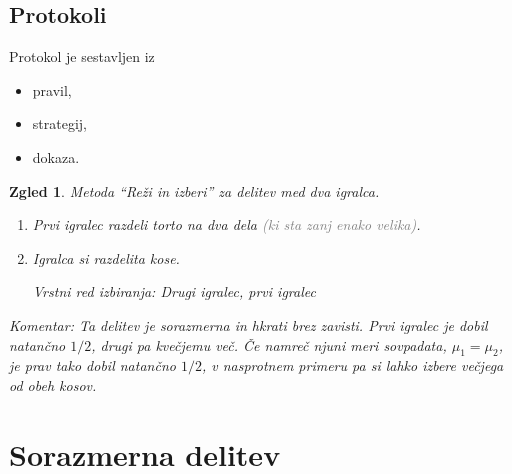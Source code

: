\documentclass{beamer}
\newtheorem{zgled}{Zgled}
\begin{document}
\subsection{Protokoli}
\begin{frame}

Protokol je sestavljen iz

\begin{itemize}
\item pravil,
\item strategij,
\item dokaza.
\end{itemize}

\begin{zgled}
Metoda ``Reži in izberi'' za delitev med dva igralca.
\begin{enumerate}

\item Prvi igralec razdeli torto na dva dela \textcolor{gray}{(ki sta zanj enako velika)}.

\item Igralca si razdelita kose. 

{\em Vrstni red izbiranja: Drugi igralec, prvi igralec}

\end{enumerate}

{\em Komentar:} Ta delitev je {\em sorazmerna\/} in hkrati {\em brez zavisti\/}. Prvi igralec je dobil natančno $1/2$, drugi pa kvečjemu več. Če namreč njuni meri sovpadata, $\mu_1 = \mu_2$, je prav tako dobil natančno $1/2$, v nasprotnem primeru pa si lahko izbere večjega od obeh kosov.


\end{zgled}

\end{frame}


\section{Sorazmerna delitev}
\end{document}
